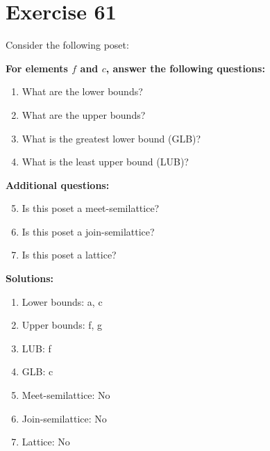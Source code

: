 \documentclass{article}
\begin{document}
\section*{Exercise 61}
Consider the following poset:
\begin{center}
\end{center}

    \textbf{For elements $f$ and $c$, answer the following questions:}
\begin{enumerate}
    \item What are the lower bounds?
    \item What are the upper bounds?
    \item What is the greatest lower bound (GLB)?
    \item What is the least upper bound (LUB)?
\end{enumerate}
    \hspace*{3ex} \textbf{Additional questions:}
\begin{enumerate}
    \setcounter{enumi}{4}
    \item Is this poset a meet-semilattice?
    \item Is this poset a join-semilattice?
    \item Is this poset a lattice?
\end{enumerate}

\textbf{Solutions:}
\begin{enumerate}
    \item Lower bounds: {a, c}
    \item Upper bounds: {f, g}
    \item LUB: f
    \item GLB: c
    \item Meet-semilattice: No
    \item Join-semilattice: No
    \item Lattice: No
\end{enumerate}
\newpage
\end{document}
